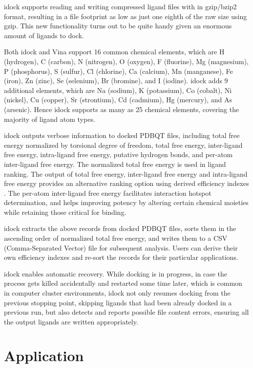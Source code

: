 idock supports reading and writing compressed ligand files with in gzip/bzip2 format, resulting in a file footprint as low as just one eighth of the raw size using gzip. This new functionality turns out to be quite handy given an enormous amount of ligands to dock.

Both idock and Vina support 16 common chemical elements, which are H (hydrogen), C (carbon), N (nitrogen), O (oxygen), F (fluorine), Mg (magnesium), P (phosphorus), S (sulfur), Cl (chlorine), Ca (calcium), Mn (manganese), Fe (iron), Zn (zinc), Se (selenium), Br (bromine), and I (iodine). idock adds 9 additional elements, which are Na (sodium), K (potassium), Co (cobalt), Ni (nickel), Cu (copper), Sr (strontium), Cd (cadmium), Hg (mercury), and As (arsenic). Hence idock supports as many as 25 chemical elements, covering the majority of ligand atom types.

idock outputs verbose information to docked PDBQT files, including total free energy normalized by torsional degree of freedom, total free energy, inter-ligand free energy, intra-ligand free energy, putative hydrogen bonds, and per-atom inter-ligand free energy. The normalized total free energy is used in ligand ranking. The output of total free energy, inter-ligand free energy and intra-ligand free energy provides an alternative ranking option using derived efficiency indexes \citep{337,336,335}. The per-atom inter-ligand free energy facilitates interaction hotspot determination, and helps improving potency by altering certain chemical moieties while retaining those critical for binding.

idock extracts the above records from docked PDBQT files, sorts them in the ascending order of normalized total free energy, and writes them to a CSV (Comma-Separated Vector) file for subsequent analysis. Users can derive their own efficiency indexes \citep{337,336,335} and re-sort the records for their particular applications.

idock enables automatic recovery. While docking is in progress, in case the process gets killed accidentally and restarted some time later, which is common in computer cluster environments, idock not only resumes docking from the previous stopping point, skipping ligands that had been already docked in a previous run, but also detects and reports possible file content errors, ensuring all the output ligands are written appropriately.

\section{Application}

